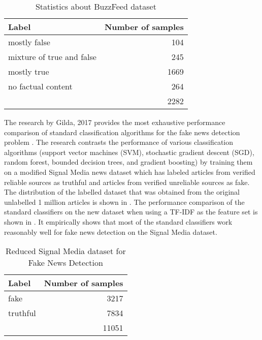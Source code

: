 \begin{table}[h]
\begin{center}
\caption{Statistics about BuzzFeed dataset}
\label{tbl:buzzfeed_dataset}
\begin{tabular}{lr}
\toprule 
Label&Number of samples \\
\midrule 
mostly false&104 \\
mixture of true and false&245 \\
mostly true&1669 \\
no factual content&264 \\
\midrule
&2282 \\
\bottomrule
\end{tabular}
\end{center}
\end{table}

The research by Gilda, 2017 provides the most exhaustive performance comparison of standard classification algorithms for the fake news detection problem \cite{gilda2017evaluating}. The research contrasts the performance of various classification algorithms  (support vector machines (SVM), stochastic gradient descent (SGD), random forest, bounded decision trees, and gradient boosting) by training them on a modified Signal Media news dataset \cite{corney2016million} which has labeled articles from verified reliable sources as truthful and articles from verified unreliable sources as fake. The distribution of the labelled dataset that was obtained from the original unlabelled 1 million articles is shown in . The performance comparison of the standard classifiers on the new dataset when using a TF-IDF as the feature set is shown in  \cite{gilda2017evaluating}. It empirically shows that most of the standard classifiers work reasonably well for fake news detection on the Signal Media dataset.

\begin{table}[h]
\begin{center}
\caption{Reduced Signal Media dataset for Fake News Detection}
\label{tbl:reduced_signal_media_dataset}
\begin{tabular}{lr}
\toprule 
Label&Number of samples \\
\midrule 
fake&3217 \\
truthful&7834 \\
\midrule
&11051 \\
\bottomrule
\end{tabular}
\end{center}
\end{table}

